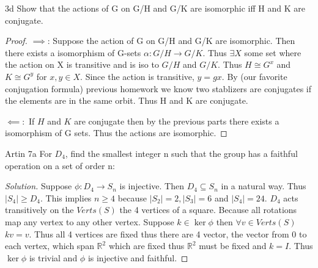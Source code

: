 \documentclass{article}
\newcommand{\R}{\mathbb{R}}
\newenvironment{solution}
{\renewcommand\qedsymbol{$\blacksquare$}\begin{proof}[Solution]}
{\end{proof}}
\begin{document}
\begin{claim}{3d}
    Show that the actions of G on G/H and G/K are isomorphic iff H and K are conjugate.
\end{claim}
\begin{proof}
    $\implies$: Suppose the action of G on G/H and G/K are isomorphic. Then there exists a isomorphism of G-sets $\alpha: G/H \to G/K$. Thus $\exists X$ some set where the action on X is transitive and is iso to $G/H$ and $G/K$. Thus $H \cong G^x$ and $K \cong G^y$ for $x, y \in X$. Since the action is transitive, $y = gx$. By (our favorite conjugation formula) previous homework we know two stablizers are conjugates if the elements are in the same orbit. Thus H and K are conjugate. 
    
    
    $\impliedby:$ If $H$ and $K$ are conjugate then by the previous parts there exists a isomorphism of G sets. Thus the actions are isomorphic.
\end{proof}

\bigskip


\begin{PROB}{Artin 7a}\label{Problem Artin 7a.}
    For $D_4$, find the smallest integer n such that the group has a faithful operation on a set of order n:
\end{PROB}
\begin{solution}
    Suppose $\phi: D_4 \to S_n$ is injective. Then $D_4 \subseteq S_n$ in a natural way. Thus $|S_4| \geq D_4$. This implies $n \geq 4$ because $|S_2| = 2, |S_3| = 6$ and $|S_4| = 24$. $D_4$ acts transitively on the $Verts(S)$ the 4 vertices of a square. Because all rotations map any vertex to any other vertex. Suppose $k \in \ker \phi$ then $\forall v \in Verts(S)$ $kv = v$. Thus all 4 vertices are fixed thus there are 4 vector, the vector from 0 to each vertex, which span $\R^2$ which are fixed thus $\R^2$ must be fixed and $k = I$. Thus $\ker \phi$ is trivial and $\phi$ is injective and faithful.
\end{solution}
\end{document}

